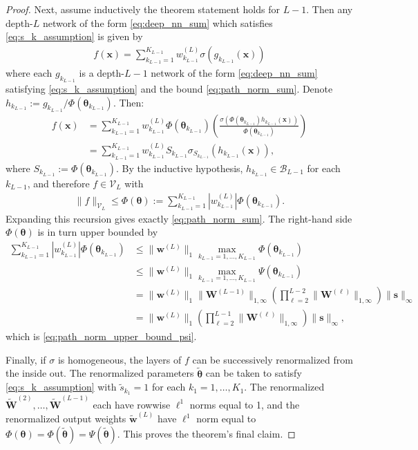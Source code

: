 \documentclass{article}
\def\vtheta{{\bm{\theta}}}
\def\vs{{\bm{s}}}
\def\vw{{\bm{w}}}
\def\vx{{\bm{x}}}
\def\mW{{\bm{W}}}
\def\cB{{\mathcal{B}}}
\def\cV{{\mathcal{V}}}
\begin{document}
\begin{appendices}
\begin{proof}
    Next, assume inductively the theorem statement holds for $L-1$. Then any depth-$L$ network of the form \eqref{eq:deep_nn_sum} which satisfies \eqref{eq:s_k_assumption} is given by
    \begin{align} \label{eq:deep_net_g}
        f(\vx) = \sum_{k_{L-1}=1}^{K_{L-1}} w_{k_{L-1}}^{(L)} \sigma( g_{k_{L-1}} (\vx))
    \end{align}
    where each $g_{k_{L-1}}$ is a depth-$L-1$ network of the form \eqref{eq:deep_nn_sum} satisfying \eqref{eq:s_k_assumption} and the bound \eqref{eq:path_norm_sum}. Denote $h_{k_{L-1}} := g_{k_{L-1}}/ \Phi(\vtheta_{k_{L-1}})$. Then:
    \begin{align} \label{eq:f_L_2_sigma_scaled}
        f(\vx) &= \sum_{k_{L-1}=1}^{K_{L-1}} w_{k_{L-1}}^{(L)} \Phi(\vtheta_{k_{L-1}}) \left( \frac{\sigma \left(  \Phi(\vtheta_{k_{L-1}}) h_{k_{L-1}} (\vx) \right)}{\Phi(\vtheta_{k_{L-1}})} \right) \\
        &= \sum_{k_{L-1}=1}^{K_{L-1}} w_{k_{L-1}}^{(L)} S_{k_{L-1}} \sigma_{S_{k_{L-1}}} (h_{k_{L-1}}(\vx)),
    \end{align}
    where $S_{k_{L-1}} := \Phi(\vtheta_{k_{L-1}})$. By the inductive hypothesis, $ h_{k_{L-1}} \in \cB_{L-1}$ for each $k_{L-1}$, and therefore $f \in \cV_L$ with
    \begin{align}
        \| f \|_{\cV_L} \leq \Phi(\vtheta) :=  \sum_{k_{L-1}=1}^{K_{L-1}} \left| w_{k_{L-1}}^{(L)} \right| \Phi(\vtheta_{k_{L-1}}).
    \end{align}
    Expanding this recursion gives exactly \eqref{eq:path_norm_sum}. The right-hand side $\Phi(\vtheta)$ is in turn upper bounded by
    \begin{align}
        \sum_{k_{L-1}=1}^{K_{L-1}} \left| w_{k_{L-1}}^{(L)} \right| \Phi(\vtheta_{k_{L-1}}) &\leq \| \vw^{(L)} \|_1 \max_{k_{L-1}=1, \dots, K_{L-1}} \Phi(\vtheta_{k_{L-1}}) \\
        &\leq \| \vw^{(L)} \|_1 \max_{k_{L-1}=1, \dots, K_{L-1}} \Psi(\vtheta_{k_{L-1}}) \\
        &= \| \vw^{(L)} \|_1 \| \mW^{(L-1)} \|_{1,\infty} \left( \prod_{\ell=2}^{L-2} \| \mW^{(\ell)} \|_{1,\infty} \right) \| \vs \|_\infty \\
        &= \| \vw^{(L)} \|_1 \left( \prod_{\ell=2}^{L-1} \| \mW^{(\ell)} \|_{1,\infty} \right) \| \vs \|_\infty,
    \end{align}
    which is \eqref{eq:path_norm_upper_bound_psi}.
    
    Finally, if $\sigma$ is homogeneous, the layers of $f$ can be successively renormalized from the inside out. The renormalized parameters $\widetilde{\vtheta}$ can be taken to satisfy \eqref{eq:s_k_assumption} with $\widetilde{s}_{k_1} = 1$ for each $k_1 = 1, \dots, K_1$. The renormalized $\widetilde{\mW}^{(2)}, \dots, \widetilde{\mW}^{(L-1)}$ each have rowwise $\ell^1$ norms equal to 1, and the renormalized output weights $\widetilde{\vw}^{(L)}$ have $\ell^1$ norm equal to $\Phi(\vtheta) = \Phi (\widetilde{\vtheta}) = \Psi(\widetilde{\vtheta})$.  This proves the theorem's final claim. 
\end{proof}


\end{appendices}
\end{document}
